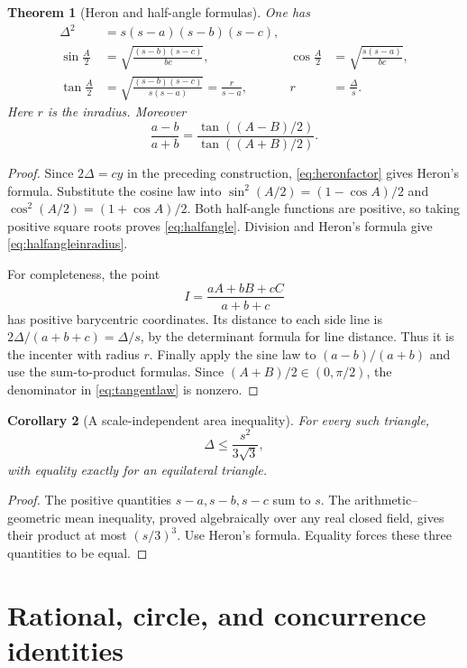 \documentclass[11pt,letterpaper]{article}
\newtheorem{theorem}{Theorem}[section]
\newtheorem{corollary}[theorem]{Corollary}
\theoremstyle{definition}
\theoremstyle{remark}
\numberwithin{equation}{section}
\begin{document}
\begin{theorem}[Heron and half-angle formulas]\label{thm:heron}
One has
\begin{align}
 \Delta^2&=s(s-a)(s-b)(s-c),\label{eq:heron}\\
 \sin\frac A2&=\sqrt{\frac{(s-b)(s-c)}{bc}},&
 \cos\frac A2&=\sqrt{\frac{s(s-a)}{bc}},\label{eq:halfangle}\\
 \tan\frac A2&=\sqrt{\frac{(s-b)(s-c)}{s(s-a)}}
              =\frac r{s-a},& r&=\frac\Delta s.\label{eq:halfangleinradius}
\end{align}
Here $r$ is the inradius. Moreover
\begin{equation}\label{eq:tangentlaw}
 \frac{a-b}{a+b}
 =\frac{\tan((A-B)/2)}{\tan((A+B)/2)}.
\end{equation}
\end{theorem}
\begin{proof}
Since $2\Delta=cy$ in the preceding construction, \eqref{eq:heronfactor} gives Heron's formula. Substitute the cosine law into
$\sin^2(A/2)=(1-\cos A)/2$ and
$\cos^2(A/2)=(1+\cos A)/2$. Both half-angle functions are positive, so taking positive square roots proves \eqref{eq:halfangle}. Division and Heron's formula give \eqref{eq:halfangleinradius}.

For completeness, the point
\[
 I=\frac{aA+bB+cC}{a+b+c}
\]
has positive barycentric coordinates. Its distance to each side line is $2\Delta/(a+b+c)=\Delta/s$, by the determinant formula for line distance. Thus it is the incenter with radius $r$. Finally apply the sine law to $(a-b)/(a+b)$ and use the sum-to-product formulas. Since $(A+B)/2\in(0,\pi/2)$, the denominator in \eqref{eq:tangentlaw} is nonzero.
\end{proof}

\begin{corollary}[A scale-independent area inequality]
For every such triangle,
\[
 \Delta\le\frac{s^2}{3\sqrt3},
\]
with equality exactly for an equilateral triangle.
\end{corollary}
\begin{proof}
The positive quantities $s-a,s-b,s-c$ sum to $s$. The arithmetic--geometric mean inequality, proved algebraically over any real closed field, gives their product at most $(s/3)^3$. Use Heron's formula. Equality forces these three quantities to be equal.
\end{proof}

\section{Rational, circle, and concurrence identities}\label{sec:classicalgeometry}
\end{document}
